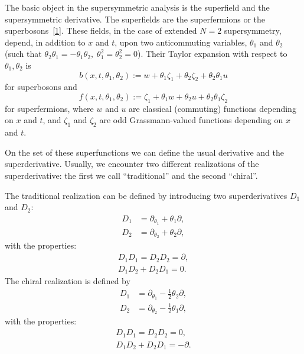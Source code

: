 {The basic object in the supersymmetric analysis is the superfield and
the supersymmetric derivative.  The superfields are the superfermions
or the superbosons~\hyperref[susy2-bib]{[1]}.  These fields, in the
case of extended $N=2$ supersymmetry, depend, in addition to $x$ and
$t$, upon two anticommuting variables, $\theta_{1}$ and $\theta_{2}$
(such that $\theta_{2}\theta_{1} = -
\theta_{1}\theta_{2},\;\theta_{1}^{2} = \theta_{2}^{2} = 0$).  Their
Taylor expansion with respect to $\theta_{1},\theta_{2}$ is
\begin{equation*}
  b(x,t,\theta_{1},\theta_{2}):=w+\theta_{1}\zeta_{1}+
  \theta_{2}\zeta_{2}+\theta_{2}\theta_{1}u
\end{equation*}
for superbosons and
\begin{equation*}
  f(x,t,\theta_{1},\theta_{2}):=\zeta_{1}+\theta_{1}w+
  \theta_{2}u+\theta_{2}\theta_{1}\zeta_{2}
\end{equation*}
for superfermions, where $w$ and $u$ are classical (commuting)
functions depending on $x$ and $t$, and $\zeta_{1}$ and $\zeta_{2}$
are odd Grassmann-valued functions depending on $x$ and $t$.

On the set of these superfunctions we can define the usual derivative
and the superderivative.  Usually, we encounter two different
realizations of the superderivative: the first we call ``traditional''
and the second ``chiral''.

The traditional realization can be defined by introducing two
superderivatives $D_{1}$ and $D_{2}$:
\begin{align*}
  D_{1} &= \partial_{\theta_{1}}+\theta_{1}\partial,\\
  D_{2} &= \partial_{\theta_{2}}+\theta_{2}\partial,
\end{align*}
with the properties:
\begin{gather*}
  D_{1} D_{1} = D_{2} D_{2} = \partial,\\
  D_{1} D_{2} + D_{2} D_{1} = 0.
\end{gather*}
The chiral realization is defined by
\begin{align*}
  D_{1} &= \partial_{\theta_{1}} - \frac{1}{2}\theta_{2}\partial,\\
  D_{2} &= \partial_{\theta_{2}} - \frac{1}{2}\theta_{1}\partial,
\end{align*}
with the properties:
\begin{gather*}
  D_{1} D_{1} = D_{2} D_{2} = 0,\\
  D_{1} D_{2} + D_{2} D_{1} = -\partial.
\end{gather*}

}
